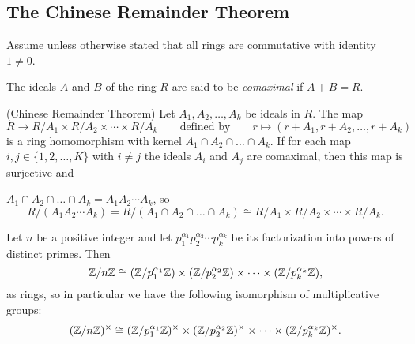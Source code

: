 \documentclass[../main]{subfiles}
\begin{document}
\subsection{The Chinese Remainder Theorem}

Assume unless otherwise stated that all rings are commutative with identity $1\neq 0$.


\begin{dfn}
 The ideals $A$ and $B$ of the ring $R$ are said to be \textit{comaximal} if $A + B = R$.
\end{dfn}


\begin{thm}
 (Chinese Remainder Theorem) Let $A_1, A_2, \ldots, A_k$ be ideals in $R$. The map 
 \[ R \to R/A_1 \times R/A_2 \times \cdots \times R/A_k \qquad \text{defined by} \qquad r\mapsto (r+A_1, r+A_2, \ldots , r+A_k) \]
 is a ring homomorphism with kernel $A_1 \cap A_2 \cap \ldots \cap A_k$. If for each map $i,j \in \{1,2, \ldots, K\}$ with $i \neq j$ the ideals $A_i$ and $A_j$ are comaximal, then this map is surjective and 
 
 \noindent $A_1 \cap A_2 \cap \ldots \cap A_k = A_1 A_2 \cdots A_k$, so
 \[ R/(A_1 A_2 \cdots A_k) = R/(A_1 \cap A_2 \cap \ldots \cap A_k) \cong R/A_1 \times R/A_2 \times \cdots \times R/A_k.\]
\end{thm}


\begin{cor}
 Let $n$ be a positive integer and let $p_1^{\alpha_1} p_2^{\alpha_2} \cdots p_k^{\alpha_k}$ be its factorization into powers of distinct primes. Then 
 \[
 \mathbb{Z}/n\mathbb{Z} \cong (\mathbb{Z}/p_1^{\alpha_1}\mathbb{Z}) \times (\mathbb{Z}/p_2^{\alpha_2}\mathbb{Z}) \times \cdots \times (\mathbb{Z}/p_k^{\alpha_k}\mathbb{Z}), 
 \]
 as rings, so in particular we have the following isomorphism of multiplicative groups:
 \[
  (\mathbb{Z}/n\mathbb{Z})^\times \cong (\mathbb{Z}/p_1^{\alpha_1}\mathbb{Z})^\times \times (\mathbb{Z}/p_2^{\alpha_2}\mathbb{Z})^\times \times \cdots \times (\mathbb{Z}/p_k^{\alpha_k}\mathbb{Z})^\times.
 \]
\end{cor}
\end{document}
